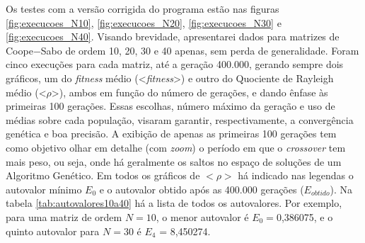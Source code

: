 	Os testes com a versão corrigida do programa estão nas figuras \ref{fig:execucoes_N10}, \ref{fig:execucoes_N20}, \ref{fig:execucoes_N30} e \ref{fig:execucoes_N40}. Visando brevidade, apresentarei dados para matrizes de Coope$-$Sabo de ordem 10, 20, 30 e 40 apenas, sem perda de generalidade. Foram cinco execuções para cada matriz, até a geração 400.000, gerando sempre dois gráficos, um do \textit{fitness} médio (<\textit{fitness}>) e outro do Quociente de Rayleigh médio (<$\rho$>), ambos em função do número de gerações, e dando ênfase às primeiras 100 gerações. Essas escolhas, número máximo da geração e uso de médias sobre cada população, visaram garantir, respectivamente, a convergência genética e boa precisão. A exibição de apenas as primeiras 100 gerações tem como objetivo olhar em detalhe (com \textit{zoom}) o período em que o \textit{crossover} tem mais peso, ou seja, onde há geralmente os saltos no espaço de soluções de um Algoritmo Genético. Em todos os gráficos de $<\rho>$ há indicado nas legendas o autovalor mínimo $E_0$ e o autovalor obtido após as 400.000 gerações ($E_{obtido}$). Na tabela \ref{tab:autovalores10a40} há a lista de todos os autovalores. Por exemplo, para uma matriz de ordem $N = 10$, o menor autovalor é $E_0 = $0,386075, e o quinto autovalor para $N = 30$ é $E_4$ = 8,450274.

